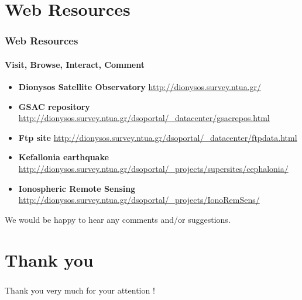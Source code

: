 \documentclass{beamer}
\begin{document}
\section{Web Resources}

\begin{frame}\frametitle{Web Resources}\framesubtitle{Visit, Browse, Interact, Comment}

\begin{itemize}
    \item \textbf{Dionysos Satellite Observatory} \url{http://dionysos.survey.ntua.gr/}  %
    \item \textbf{GSAC repository} \url{http://dionysos.survey.ntua.gr/dsoportal/_datacenter/gsacrepos.html} %
    \item \textbf{Ftp site} \url{http://dionysos.survey.ntua.gr/dsoportal/_datacenter/ftpdata.html}  %
    \item \textbf{Kefallonia earthquake} \url{http://dionysos.survey.ntua.gr/dsoportal/_projects/supersites/cephalonia/}  %
    \item \textbf{Ionospheric Remote Sensing} \url{http://dionysos.survey.ntua.gr/dsoportal/_projects/IonoRemSens/}  %
\end{itemize}

We would be happy to hear any comments and/or suggestions.

\end{frame}

\section{Thank you}

\begin{frame}\frametitle{}\framesubtitle{}
    \begin{center}
    Thank you very much for your attention !
    \end{center}
\end{frame}
\end{document}

